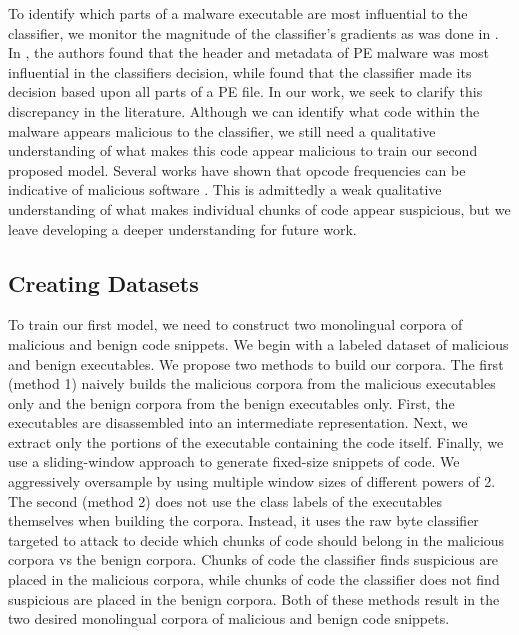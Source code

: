 \documentclass[conference]{IEEEtran}
\begin{document}
To identify which parts of a malware executable are most influential to the classifier, we monitor the magnitude of the classifier's gradients as was done in \cite{coull2019activation, demetrio2019explaining, bose2020explaining}. In \cite{bose2020explaining}, the authors found that the header and metadata of PE malware was most influential in the classifiers decision, while \cite{demetrio2019explaining} found that the classifier made its decision based upon all parts of a PE file. In our work, we seek to clarify this discrepancy in the literature. Although we can identify what code within the malware appears malicious to the classifier, we still need a qualitative understanding of what makes this code appear malicious to train our second proposed model. Several works have shown that opcode frequencies can be indicative of malicious software \cite{yewale2016malware, kucuk2020deceiving, li2020adversarial}. This is admittedly a weak qualitative understanding of what makes individual chunks of code appear suspicious, but we leave developing a deeper understanding for future work.

\subsection{Creating Datasets}
\label{sec:Proposal:Dataset}

To train our first model, we need to construct two monolingual corpora of malicious and benign code snippets. We begin with a labeled dataset of malicious and benign executables. We propose two methods to build our corpora. The first (method 1) naively builds the malicious corpora from the malicious executables only and the benign corpora from the benign executables only. First, the executables are disassembled into an intermediate representation. Next, we extract only the portions of the executable containing the code itself. Finally, we use a sliding-window approach to generate fixed-size snippets of code. We aggressively oversample by using multiple window sizes of different powers of 2. The second (method 2) does not use the class labels of the executables themselves when building the corpora. Instead, it uses the raw byte classifier targeted to attack to decide which chunks of code should belong in the malicious corpora vs the benign corpora. Chunks of code the classifier finds suspicious are placed in the malicious corpora, while chunks of code the classifier does not find suspicious are placed in the benign corpora. Both of these methods result in the two desired monolingual corpora of malicious and benign code snippets. 
\end{document}
